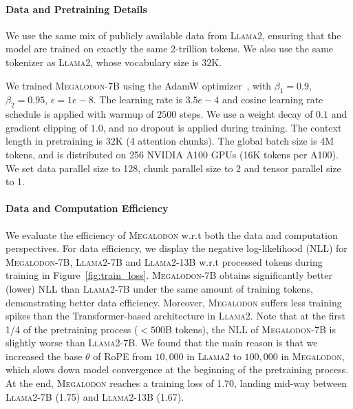 \paragraph{Data and Pretraining Details} We use the same mix of publicly available data from \textsc{Llama}2, ensuring that the model are trained on exactly the same 2-trillion tokens. We also use the same tokenizer as \textsc{Llama}2, whose vocabulary size is $32$K.

We trained \textsc{Megalodon}-7B using the AdamW optimizer~\citep{loshchilov2019decoupled}, with $\beta_1=0.9$, $\beta_2=0.95$, $\epsilon=1e-8$. The learning rate is $3.5e-4$ and cosine learning rate schedule is applied with warmup of $2500$ steps. We use a weight decay of $0.1$ and gradient clipping of $1.0$, and no dropout is applied during training. The context length in pretraining is $32$K (4 attention chunks). The global batch size is 4M tokens, and is distributed on 256 NVIDIA A100 GPUs (16K tokens per A100). We set data parallel size to 128, chunk parallel size to 2 and tensor parallel size to 1.

\paragraph{Data and Computation Efficiency} We evaluate the efficiency of \textsc{Megalodon} w.r.t both the data and computation perspectives. For data efficiency, we display the negative log-likelihood (NLL) for \textsc{Megalodon}-7B, \textsc{Llama}2-7B and \textsc{Llama}2-13B w.r.t processed tokens during training in Figure~\ref{fig:train_loss}.
\textsc{Megalodon}-7B obtains significantly better (lower) NLL than \textsc{Llama}2-7B under the same amount of training tokens, demonstrating better data efficiency. Moreover, \textsc{Megalodon} suffers less training spikes than the Transformer-based architecture in \textsc{Llama}2. 
Note that at the first 1/4 of the pretraining process ($<500$B tokens), the NLL of \textsc{Megalodon}-7B is slightly worse than \textsc{Llama}2-7B. We found that the main reason is that we increased the base $\theta$ of RoPE from $10,000$ in \textsc{Llama}2 to $100,000$ in \textsc{Megalodon}, which slows down model convergence at the beginning of the pretraining process. At the end, \textsc{Megalodon} reaches a training loss of 1.70, landing mid-way between \textsc{Llama}2-7B (1.75) and \textsc{Llama}2-13B (1.67). 

